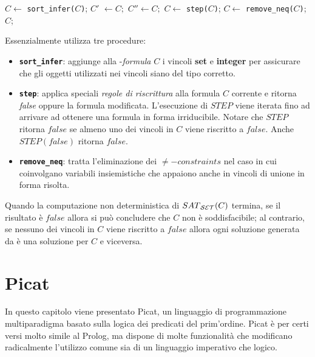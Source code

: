 \documentclass[12pt,a4paper,openright]{book} %
\begin{document}
\begin{algorithm}
\begin{algorithmic}[1]
\Procedure{\satset{}}{}
\State $C \gets $ \texttt{sort\_infer($C$)};
\Repeat
\State $C'$ $\gets C;$
\Repeat
\State $C'' \gets C;$
\State $C \gets $ \texttt{step($C$)};
\State $C \gets $ \texttt{remove\_neq($C$)};
\State
\State\Return $C$;
\EndProcedure
\end{algorithmic}
\end{algorithm}

Essenzialmente \satset{} utilizza tre procedure:

\begin{itemize}
\item \textbf{\texttt{sort\_infer}}: aggiunge alla \calset{}-\textit{formula} $C$ i vincoli \textbf{set} e \textbf{integer} per assicurare che gli oggetti utilizzati nei vincoli siano del tipo corretto.
    
\item \textbf{\texttt{step}}: applica speciali \textit{regole di riscrittura} alla formula $C$ corrente e ritorna \textit{false} oppure la formula modificata. L'esecuzione di $STEP$ viene iterata fino ad arrivare ad ottenere una formula in forma irriducibile. Notare che $STEP$ ritorna $false$ se almeno uno dei vincoli in $C$ viene riscritto a $false$. Anche $STEP(false)$ ritorna $false$.
    
\item \textbf{\texttt{remove\_neq}}: tratta l'eliminazione dei $\neq-constraints$ nel caso in cui coinvolgano variabili insiemistiche che appaiono anche in vincoli di unione in forma risolta.
\end{itemize}

Quando la computazione non deterministica di $SAT\textsubscript{\ensuremath{\mathcal{S}}\ensuremath{\mathcal{E}}\ensuremath{\mathcal{T}}}{}(C)$ termina, se il risultato è $false$ allora si può concludere che $C$ non è soddisfacibile; al contrario, se nessuno dei vincoli in $C$ viene riscritto a $false$ allora ogni soluzione generata da \satset{} è una soluzione per $C$ e viceversa.


\chapter{Picat}
\label{ch:picat}

\minitoc

In questo capitolo viene presentato Picat, un linguaggio di programmazione multiparadigma basato sulla logica dei predicati del prim'ordine. Picat è per certi versi molto simile al Prolog, ma dispone di molte funzionalità che modificano radicalmente l'utilizzo comune sia di un linguaggio imperativo che logico.
\end{document}

